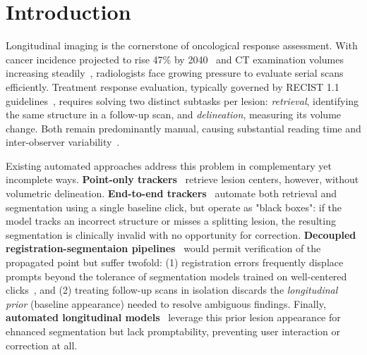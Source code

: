 \section{Introduction}

Longitudinal imaging is the cornerstone of oncological response assessment. With cancer incidence projected to rise 47\% by 2040~\cite{bray2024global} and CT examination volumes increasing steadily~\cite{rocholl2025unstable}, radiologists face growing pressure to evaluate serial scans efficiently. Treatment response evaluation, typically governed by RECIST 1.1 guidelines~\cite{recist}, requires solving two distinct subtasks per lesion: \textit{retrieval}, identifying the same structure in a follow-up scan, and \textit{delineation}, measuring its volume change. Both remain predominantly manual, causing substantial reading time and inter-observer variability~\cite{hering2024improving,jacobs2021assisted,lu2021randomized}.

\noindent Existing automated approaches address this problem in complementary yet incomplete ways. \textbf{Point-only trackers}~\cite{yan2022sam,vizitiu2023multi} retrieve lesion centers, however, without volumetric delineation. \textbf{End-to-end trackers}~\cite{Rokuss_2025_CVPR} automate both retrieval and segmentation using a single baseline click, but operate as "black boxes": if the model tracks an incorrect structure or misses a splitting lesion, the resulting segmentation is clinically invalid with no opportunity for correction. \textbf{Decoupled registration-segmentaion pipelines}~\cite{hering2021whole} would permit verification of the propagated point but suffer twofold: (1) registration errors frequently displace prompts beyond the tolerance of segmentation models trained on well-centered clicks~\cite{rocholl2025unstable,scribbleprompt,nnInteractive,du2024segvol}, and (2) treating follow-up scans in isolation discards the \textit{longitudinal prior} (baseline appearance) needed to resolve ambiguous findings. Finally, \textbf{automated longitudinal models}~\cite{longiseg, szeskin2023liver, wu2023coactseg} leverage this prior lesion appearance for ehnanced segmentation but lack promptability, preventing user interaction or correction at all.\\


